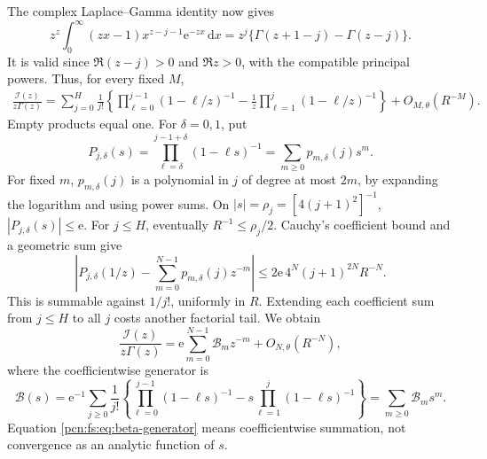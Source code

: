 \documentclass[11pt,letterpaper]{article}
\theoremstyle{remark}\newtheorem{remark}[theorem]{Remark}
\newcommand{\dd}{\,\mathrm d}
\newcommand{\ee}{\mathrm e}
\begin{document}
The complex Laplace--Gamma identity now gives
\[
 z^z\int_0^\infty(zx-1)x^{z-j-1}\ee^{-zx}\dd x
       =z^j\{\Gamma(z+1-j)-\Gamma(z-j)\}.
\]
It is valid since $\Re(z-j)>0$ and $\Re z>0$, with the compatible principal powers. Thus, for every fixed $M$,
\begin{align}\label{pcn:fs:eq:product-sum}
 \frac{\mathcal I(z)}{z\Gamma(z)}
 =\sum_{j=0}^H\frac1{j!}\left\{
 \prod_{\ell=0}^{j-1}(1-\ell/z)^{-1}
 -\frac1z\prod_{\ell=1}^{j}(1-\ell/z)^{-1}\right\}
 +O_{M,\theta}(R^{-M}).
\end{align}
Empty products equal one. For $\delta=0,1$, put
\[
 P_{j,\delta}(s)=\prod_{\ell=\delta}^{j-1+\delta}(1-\ell s)^{-1}
                =\sum_{m\ge0}p_{m,\delta}(j)s^m.
\]
For fixed $m$, $p_{m,\delta}(j)$ is a polynomial in $j$ of degree at most $2m$, by expanding the logarithm and using power sums. On
$|s|=\rho_j=[4(j+1)^2]^{-1}$, $|P_{j,\delta}(s)|\le\ee$. For $j\le H$, eventually $R^{-1}\le\rho_j/2$. Cauchy's coefficient bound and a geometric sum give
\begin{equation}\label{pcn:fs:eq:product-remainder}
 \left|P_{j,\delta}(1/z)-\sum_{m=0}^{N-1}
                  p_{m,\delta}(j)z^{-m}\right|
       \le2\ee\,4^N(j+1)^{2N}R^{-N}.
\end{equation}
This is summable against $1/j!$, uniformly in $R$. Extending each coefficient sum from $j\le H$ to all $j$ costs another factorial tail. We obtain
\[
 \frac{\mathcal I(z)}{z\Gamma(z)}
       =\ee\sum_{m=0}^{N-1}\mathcal B_mz^{-m}+O_{N,\theta}(R^{-N}),
\]
where the coefficientwise generator is
\begin{equation}\label{pcn:fs:eq:beta-generator}
 \mathcal B(s)=\ee^{-1}\sum_{j\ge0}\frac1{j!}
 \left\{\prod_{\ell=0}^{j-1}(1-\ell s)^{-1}
      -s\prod_{\ell=1}^{j}(1-\ell s)^{-1}\right\}
        =\sum_{m\ge0}\mathcal B_ms^m.
\end{equation}
Equation \eqref{pcn:fs:eq:beta-generator} means coefficientwise summation, not convergence as an analytic function of $s$.
\end{document}
